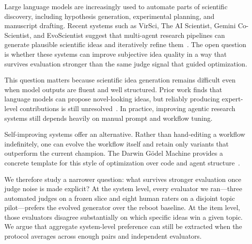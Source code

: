 \documentclass{article}
\begin{document}
Large language models are increasingly used to automate parts of scientific discovery, including hypothesis generation, experimental planning, and manuscript drafting. Recent systems such as VirSci, The AI Scientist, Gemini Co-Scientist, and EvoScientist suggest that multi-agent research pipelines can generate plausible scientific ideas and iteratively refine them~\cite{su2024twoheads,lu2024aiscientist,gottweis2025coscientist,lyu2026evoscientist}. The open question is whether these systems can improve subjective idea quality in a way that survives evaluation stronger than the same judge signal that guided optimization.

This question matters because scientific idea generation remains difficult even when model outputs are fluent and well structured. Prior work finds that language models can propose novel-looking ideas, but reliably producing expert-level contributions is still unresolved~\cite{si2024novelideas}. In practice, improving agentic research systems still depends heavily on manual prompt and workflow tuning.

Self-improving systems offer an alternative. Rather than hand-editing a workflow indefinitely, one can evolve the workflow itself and retain only variants that outperform the current champion. The Darwin G\"{o}del Machine provides a concrete template for this style of optimization over code and agent structure~\cite{zhang2025darwin}.

We therefore study a narrower question: what survives stronger evaluation once judge noise is made explicit? At the system level, every evaluator we ran---three automated judges on a frozen slice and eight human raters on a disjoint topic pilot---prefers the evolved generator over the reboot baseline. At the item level, those evaluators disagree substantially on which specific ideas win a given topic. We argue that aggregate system-level preference can still be extracted when the protocol averages across enough pairs and independent evaluators.
\end{document}
